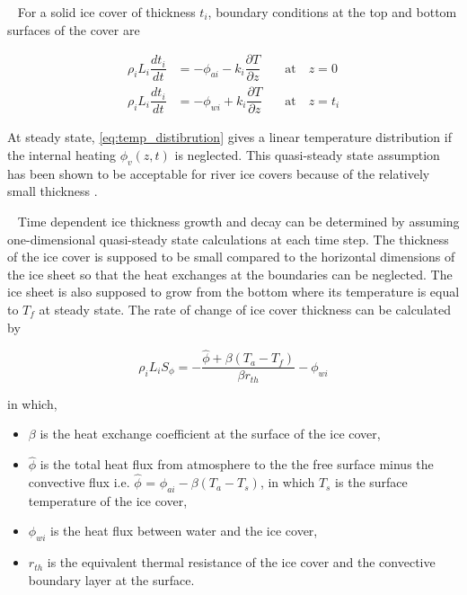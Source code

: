 ~\newline
For a solid ice cover of thickness $t_i$, boundary conditions at the top and bottom surfaces of the cover are

\begin{equation} \label{eq:bdy_top}
\begin{aligned}
\rho_i L_i \dfrac{dt_i}{dt} &= -\phi_{ai} - k_i \dfrac{\partial T}{\partial z} \quad & \text{at} \quad z=0 \\
\rho_i L_i \dfrac{dt_i}{dt} &= -\phi_{wi} + k_i \dfrac{\partial T}{\partial z} \quad & \text{at} \quad z=t_i
\end{aligned}
\end{equation}

At steady state, \eqref{eq:temp_distibrution} gives a linear temperature distribution if the internal heating $\phi_v(z,t)$ is neglected. This quasi-steady state assumption has been shown to be acceptable for river ice covers because of the relatively small thickness \cite{Greene1981}.

~\newline
Time dependent ice thickness growth and decay can be determined by assuming one-dimensional quasi-steady state calculations at each time step. The thickness of the ice cover is supposed to be small compared to the horizontal dimensions of the ice sheet so that the heat exchanges at the boundaries can be neglected. The ice sheet is also supposed to grow from the bottom where its temperature is equal to $T_f$ at steady state. The rate of change of ice cover thickness can be calculated by

\begin{equation} \label{eq:ice_snow}
\rho_i L_i S_{\phi} = - \dfrac{\hat{\phi} + \beta (T_a-T_f) }{\beta r_{th}}  -\phi_{wi}
\end{equation}

in which,
\begin{itemize}
    \item $\beta$ is the heat exchange coefficient at the surface of the ice cover,
    \item $\hat{\phi}$ is the total heat flux from atmosphere to the the free surface minus the convective flux i.e. $\hat{\phi}$ = $\phi_{ai} - \beta (T_a-T_s)$, in which $T_s$ is the surface temperature of the ice cover,
    \item $\phi_{wi}$ is the heat flux between water and the ice cover,
    \item $r_{th}$ is the equivalent thermal resistance of the ice cover and the convective boundary layer at the surface.
\end{itemize}

